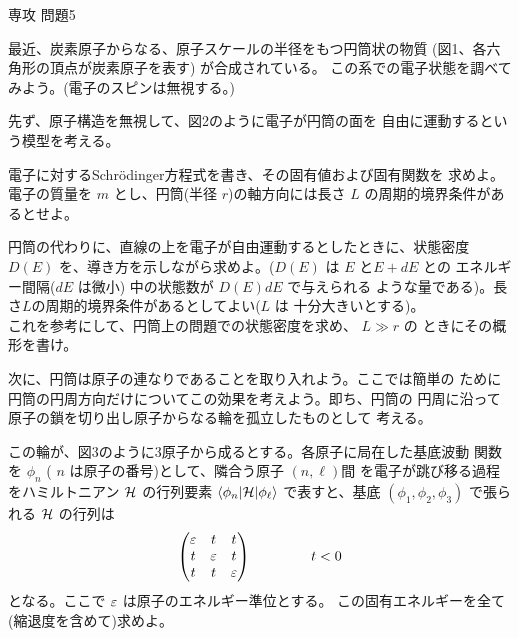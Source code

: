 \documentclass[fleqn]{jbook}
\begin{document}
\begin{question}{専攻 問題5}{}

最近、炭素原子からなる、原子スケールの半径をもつ円筒状の物質
(図1、各六角形の頂点が炭素原子を表す) が合成されている。
この系での電子状態を調べてみよう。(電子のスピンは無視する。)


\begin{subquestions}
\SubQuestion
  先ず、原子構造を無視して、図2のように電子が円筒の面を
  自由に運動するという模型を考える。

  \begin{subsubquestions}
  \SubSubQuestion
    電子に対するSchr\"{o}dinger方程式を書き、その固有値および固有関数を
    求めよ。電子の質量を $m$ とし、円筒(半径 $r$)の軸方向には長さ $L$
    の周期的境界条件があるとせよ。

  \SubSubQuestion
    円筒の代わりに、直線の上を電子が自由運動するとしたときに、状態密度
    $D(E)$ を、導き方を示しながら求めよ。($D(E)$ は $E$ と$E+dE$ との
    エネルギー間隔($dE$ は微小) 中の状態数が $D(E)dE$ で与えられる
    ような量である)。長さ$L$の周期的境界条件があるとしてよい($L$ は
    十分大きいとする)。\\
    これを参考にして、円筒上の問題での状態密度を求め、 $L\gg r$ の
    ときにその概形を書け。
  \end{subsubquestions}

\SubQuestion
  次に、円筒は原子の連なりであることを取り入れよう。ここでは簡単の
  ために円筒の円周方向だけについてこの効果を考えよう。即ち、円筒の
  円周に沿って原子の鎖を切り出し原子からなる輪を孤立したものとして
  考える。

  \begin{subsubquestions}
  \SubSubQuestion
    この輪が、図3のように3原子から成るとする。各原子に局在した基底波動
    関数を $\phi_n$ ( $n$ は原子の番号)として、隣合う原子 $(n,\ell)$間
    を電子が跳び移る過程をハミルトニアン ${\cal H}$ の行列要素
    $\langle{\phi_n}|{{\cal H}}|{\phi_\ell}\rangle$ で表すと、基底
    $(\phi_1,\phi_2,\phi_3)$ で張られる ${\cal H}$ の行列は
%
    \[ \begin{pmatrix}%
         \eps & t & t \\
         t & \eps & t \\
         t & t & \eps \\ \end{pmatrix}\hspace{15mm} t<0 \]
%
    となる。ここで $\varepsilon$ は原子のエネルギー準位とする。
    この固有エネルギーを全て(縮退度を含めて)求めよ。



\end{subsubquestions}
\end{subquestions}
\end{question}
\end{document}
